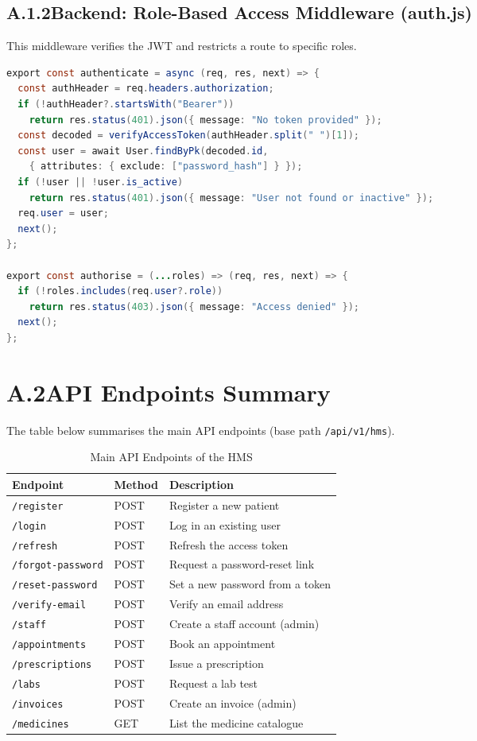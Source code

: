 \documentclass[12pt,a4paper]{report}
\begin{document}
\subsection*{A.1.2\quad Backend: Role-Based Access Middleware (auth.js)}
This middleware verifies the JWT and restricts a route to specific roles.
\begin{lstlisting}[language=Java]
export const authenticate = async (req, res, next) => {
  const authHeader = req.headers.authorization;
  if (!authHeader?.startsWith("Bearer"))
    return res.status(401).json({ message: "No token provided" });
  const decoded = verifyAccessToken(authHeader.split(" ")[1]);
  const user = await User.findByPk(decoded.id,
    { attributes: { exclude: ["password_hash"] } });
  if (!user || !user.is_active)
    return res.status(401).json({ message: "User not found or inactive" });
  req.user = user;
  next();
};

export const authorise = (...roles) => (req, res, next) => {
  if (!roles.includes(req.user?.role))
    return res.status(403).json({ message: "Access denied" });
  next();
};
\end{lstlisting}

\section*{A.2\quad API Endpoints Summary}
The table below summarises the main API endpoints (base path \texttt{/api/v1/hms}).
\begin{table}[htbp]
\centering
\renewcommand{\arraystretch}{1.25}
\begin{tabular}{@{}p{5.6cm} p{1.8cm} p{5.4cm}@{}}
\toprule
\textbf{Endpoint} & \textbf{Method} & \textbf{Description} \\
\midrule
\texttt{/register} & POST & Register a new patient \\
\texttt{/login} & POST & Log in an existing user \\
\texttt{/refresh} & POST & Refresh the access token \\
\texttt{/forgot-password} & POST & Request a password-reset link \\
\texttt{/reset-password} & POST & Set a new password from a token \\
\texttt{/verify-email} & POST & Verify an email address \\
\texttt{/staff} & POST & Create a staff account (admin) \\
\texttt{/appointments} & POST & Book an appointment \\
\texttt{/prescriptions} & POST & Issue a prescription \\
\texttt{/labs} & POST & Request a lab test \\
\texttt{/invoices} & POST & Create an invoice (admin) \\
\texttt{/medicines} & GET & List the medicine catalogue \\
\bottomrule
\end{tabular}
\caption{Main API Endpoints of the HMS}
\label{tab:api}
\end{table}
\end{document}
